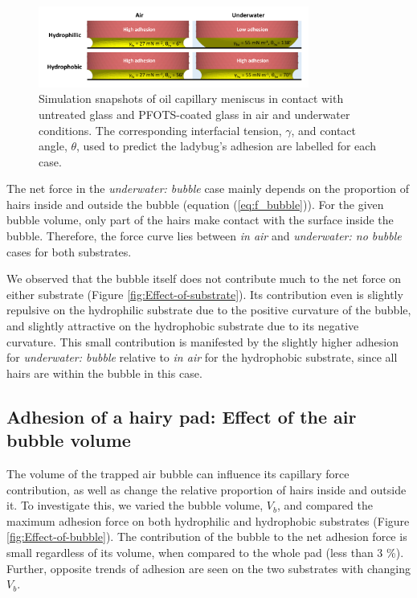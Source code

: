 \documentclass[vruler,JEB]{COB}%
\begin{document}
\begin{figure}
\includegraphics[width=3.5in]{Figure-8-contact_angle_schematic}\caption{\label{fig:Oil-contact-images}Simulation snapshots of oil capillary
meniscus in contact with untreated glass and PFOTS-coated glass in air and underwater conditions.
The corresponding interfacial tension, $\gamma$, and contact
angle, $\theta$, used to predict the ladybug's adhesion
are labelled for each case.}
\end{figure}

The net force in the \emph{underwater: bubble} case mainly depends
on the proportion of hairs inside and outside the bubble (equation
(\ref{eq:f_bubble})). For the given bubble volume, only part of the
hairs make contact with the surface inside the bubble.
Therefore, the force curve lies between \emph{in air} and \emph{underwater:
no bubble} cases for both substrates.

We observed that the bubble itself does not contribute much to the net force
on either substrate (Figure \ref{fig:Effect-of-substrate}). Its contribution
even is slightly repulsive on the hydrophilic substrate due to the
positive curvature of the bubble, and slightly attractive on the hydrophobic
substrate due to its negative curvature. This small contribution is
manifested by the slightly higher adhesion for \emph{underwater: bubble}
relative to \emph{in air} for the hydrophobic substrate, since all
hairs are within the bubble in this case.

\subsection{Adhesion of a hairy pad: Effect of the air bubble volume}

The volume of the trapped air bubble can influence its capillary force contribution,
as well as change the relative proportion of hairs inside and outside
it. To investigate this, we varied the bubble volume, $V_{b}$,
and compared the maximum adhesion force on both hydrophilic and hydrophobic
substrates (Figure \ref{fig:Effect-of-bubble}). The contribution
of the bubble to the net adhesion force is small regardless of its
volume, when compared to the whole pad (less than 3 \%). Further, opposite trends of
adhesion are seen on the two substrates with changing $V_{b}$.
\end{document}
